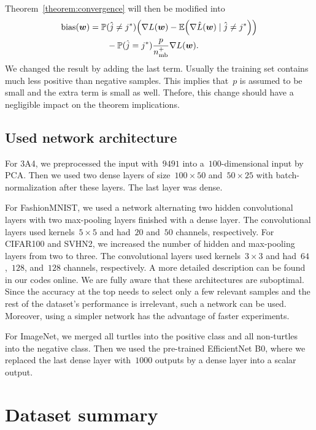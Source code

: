 Theorem~\ref{theorem:convergence} will then be modified into
\begin{equation*}
  \begin{aligned}
    \bias(\bm w)
    & = \PP(\hat j\neq j^*) \Brac{\nabla L(\bm w) - \EE\Brac{\nabla \hat L(\bm w) \mid \hat j\neq j^*}} \\
    & \qquad - \PP(\hat j= j^*)\frac{p}{\nmin^+}\nabla L(\bm w).
  \end{aligned}
\end{equation*}
We changed the result by adding the last term. Usually the training set contains much less positive than negative samples. This implies that~$p$ is assumed to be small and the extra term is small as well. Thefore, this change should have a negligible impact on the theorem implications.

\subsection{Used network architecture}\label{app:network}

For 3A4, we preprocessed the input with~$9491$ into a~$100$-dimensional input by PCA. Then we used two dense layers of size~$100\times 50$ and~$50\times 25$ with batch-normalization after these layers. The last layer was dense.

For FashionMNIST, we used a network alternating two hidden convolutional layers with two max-pooling layers finished with a dense layer. The convolutional layers used kernels~$5\times 5$ and had~$20$ and~$50$ channels, respectively. For CIFAR100 and SVHN2, we increased the number of hidden and max-pooling layers from two to three. The convolutional layers used kernels~$3\times 3$ and had~$64$,~$128$, and~$128$ channels, respectively. A more detailed description can be found in our codes online. We are fully aware that these architectures are suboptimal. Since the accuracy at the top needs to select only a few relevant samples and the rest of the dataset's performance is irrelevant, such a network can be used. Moreover, using a simpler network has the advantage of faster experiments.

For ImageNet, we merged all turtles into the positive class and all non-turtles into the negative class. Then we used the pre-trained EfficientNet B0, where we replaced the last dense layer with~$1000$ outputs by a dense layer into a scalar output.

\section{Dataset summary}

